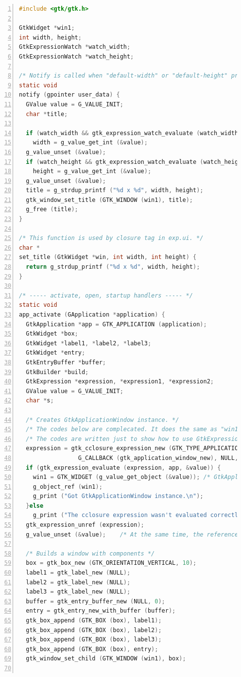 \begin{lstlisting}[language=C, numbers=left]
#include <gtk/gtk.h>

GtkWidget *win1;
int width, height;
GtkExpressionWatch *watch_width;
GtkExpressionWatch *watch_height;

/* Notify is called when "default-width" or "default-height" property is changed. */
static void
notify (gpointer user_data) {
  GValue value = G_VALUE_INIT;
  char *title;

  if (watch_width && gtk_expression_watch_evaluate (watch_width, &value))
    width = g_value_get_int (&value);
  g_value_unset (&value);
  if (watch_height && gtk_expression_watch_evaluate (watch_height, &value))
    height = g_value_get_int (&value);
  g_value_unset (&value);
  title = g_strdup_printf ("%d x %d", width, height);
  gtk_window_set_title (GTK_WINDOW (win1), title);
  g_free (title);
}

/* This function is used by closure tag in exp.ui. */
char *
set_title (GtkWidget *win, int width, int height) {
  return g_strdup_printf ("%d x %d", width, height);
}

/* ----- activate, open, startup handlers ----- */
static void
app_activate (GApplication *application) {
  GtkApplication *app = GTK_APPLICATION (application);
  GtkWidget *box;
  GtkWidget *label1, *label2, *label3;
  GtkWidget *entry;
  GtkEntryBuffer *buffer;
  GtkBuilder *build;
  GtkExpression *expression, *expression1, *expression2;
  GValue value = G_VALUE_INIT;
  char *s;

  /* Creates GtkApplicationWindow instance. */
  /* The codes below are complecated. It does the same as "win1 = gtk_application_window_new (app);". */
  /* The codes are written just to show how to use GtkExpression. */
  expression = gtk_cclosure_expression_new (GTK_TYPE_APPLICATION_WINDOW, NULL, 0, NULL,
                 G_CALLBACK (gtk_application_window_new), NULL, NULL);
  if (gtk_expression_evaluate (expression, app, &value)) {
    win1 = GTK_WIDGET (g_value_get_object (&value)); /* GtkApplicationWindow */
    g_object_ref (win1);
    g_print ("Got GtkApplicationWindow instance.\n");
  }else
    g_print ("The cclosure expression wasn't evaluated correctly.\n");
  gtk_expression_unref (expression);
  g_value_unset (&value);    /* At the same time, the reference count of win1 is decreased by one. */

  /* Builds a window with components */
  box = gtk_box_new (GTK_ORIENTATION_VERTICAL, 10);
  label1 = gtk_label_new (NULL);
  label2 = gtk_label_new (NULL);
  label3 = gtk_label_new (NULL);
  buffer = gtk_entry_buffer_new (NULL, 0);
  entry = gtk_entry_new_with_buffer (buffer);
  gtk_box_append (GTK_BOX (box), label1);
  gtk_box_append (GTK_BOX (box), label2);
  gtk_box_append (GTK_BOX (box), label3);
  gtk_box_append (GTK_BOX (box), entry);
  gtk_window_set_child (GTK_WINDOW (win1), box);


\end{lstlisting}
